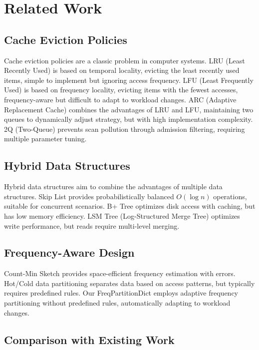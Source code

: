 \documentclass[11pt,a4paper]{article}
\begin{document}
\section{Related Work}

\subsection{Cache Eviction Policies}

Cache eviction policies are a classic problem in computer systems. LRU (Least Recently Used) \cite{mattson1970} is based on temporal locality, evicting the least recently used items, simple to implement but ignoring access frequency. LFU (Least Frequently Used) \cite{eleftheriou2006} is based on frequency locality, evicting items with the fewest accesses, frequency-aware but difficult to adapt to workload changes. ARC (Adaptive Replacement Cache) \cite{megiddo2003} combines the advantages of LRU and LFU, maintaining two queues to dynamically adjust strategy, but with high implementation complexity. 2Q (Two-Queue) \cite{johnson1994} prevents scan pollution through admission filtering, requiring multiple parameter tuning.

\subsection{Hybrid Data Structures}

Hybrid data structures aim to combine the advantages of multiple data structures. Skip List \cite{pugh1990} provides probabilistically balanced $O(\log n)$ operations, suitable for concurrent scenarios. B+ Tree optimizes disk access with caching, but has low memory efficiency. LSM Tree (Log-Structured Merge Tree) \cite{oneil1996} optimizes write performance, but reads require multi-level merging.

\subsection{Frequency-Aware Design}

Count-Min Sketch \cite{cormode2005} provides space-efficient frequency estimation with errors. Hot/Cold data partitioning \cite{graefe2010} separates data based on access patterns, but typically requires predefined rules. Our FreqPartitionDict employs adaptive frequency partitioning without predefined rules, automatically adapting to workload changes.

\subsection{Comparison with Existing Work}
\end{document}
